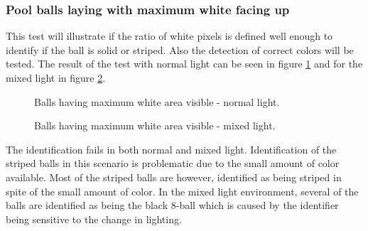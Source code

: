 \subsubsection{Pool balls laying with maximum white facing up}
This test will illustrate if the ratio of white pixels is defined well enough to identify if the ball is solid or striped. Also the detection of correct colors will be tested. The result of the test with normal light can be seen in figure \ref{fig:maxnormal} and for the mixed light in figure \ref{fig:maxmixed}.

\begin{figure}[H]
  \centering
  \quad
	\quad
   \caption{Balls having maximum white area visible - normal light.}
  \label{fig:maxnormal}
\end{figure}

\begin{figure}[H]
  \centering
  \quad
  \quad
   \caption{Balls having maximum white area visible - mixed light.}
  \label{fig:maxmixed}
\end{figure}
The identification fails in both normal and mixed light. Identification of the striped balls in this scenario is problematic due to the small amount of color available. Most of the striped balls are however, identified as being striped in spite of the small amount of color. In the mixed light environment, several of the balls are identified as being the black 8-ball which is caused by the identifier being sensitive to the change in lighting.

